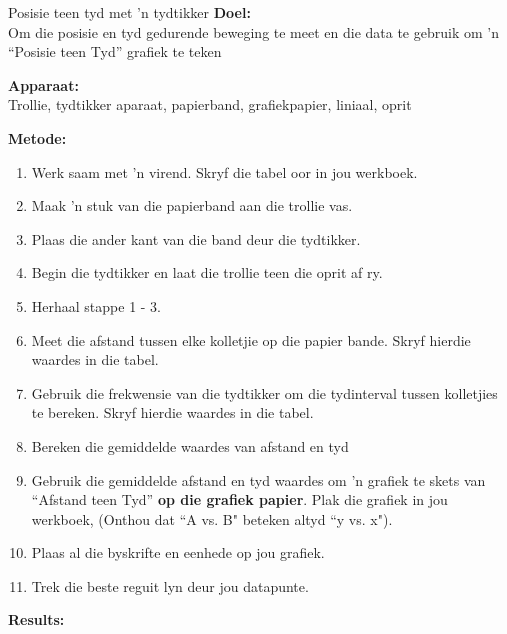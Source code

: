 \begin{f_experiment}{Posisie teen tyd met  'n tydtikker}
            \nopagebreak
\textbf{Doel:}\\
Om die posisie en tyd gedurende beweging te meet en die data te gebruik om  'n ``Posisie teen Tyd'' grafiek te teken \par

\textbf{Apparaat:}\\
Trollie, tydtikker aparaat, papierband, grafiekpapier, liniaal, oprit \par
\textbf{Metode:}
\begin{enumerate}[noitemsep, label=\textbf{\arabic*}. ] 
    \item Werk saam met  'n virend. Skryf die tabel oor in jou werkboek.
    \item Maak  'n stuk van die papierband aan die trollie vas.
    \item Plaas die ander kant van die band deur die tydtikker.
    \item Begin die tydtikker en laat die trollie teen die oprit af ry.
    \item Herhaal stappe 1 - 3.
    \item Meet die afstand tussen elke kolletjie op die papier bande. Skryf hierdie waardes in die tabel.
    \item Gebruik die frekwensie van die tydtikker om die tydinterval tussen kolletjies te bereken. Skryf hierdie waardes in die tabel. 
    \item Bereken die gemiddelde waardes van afstand en tyd
    \item Gebruik die gemiddelde afstand en tyd waardes om  'n grafiek te skets van ``Afstand teen Tyd'' \textbf{op die grafiek papier}. Plak die grafiek in jou werkboek, (Onthou dat ``A vs. B" beteken altyd ``y vs. x").
    \item Plaas al die byskrifte en eenhede op jou grafiek.
    \item Trek die beste reguit lyn deur jou datapunte.
\end{enumerate}
        \par 
        \label{m38795*id7141045}
          \textbf{Results:}\\
        \par 
          \begin{table}[H]
        \begin{center}

\end{center}
\end{table}
\end{f_experiment}
